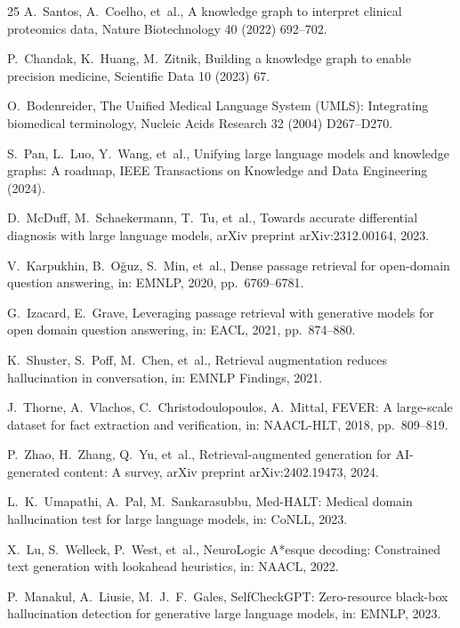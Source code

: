 \documentclass[review]{elsarticle}
\begin{document}
\begin{thebibliography}{25}
A.~Santos, A.~Coelho, et~al., A knowledge graph to interpret clinical proteomics data, Nature Biotechnology 40 (2022) 692--702.

P.~Chandak, K.~Huang, M.~Zitnik, Building a knowledge graph to enable precision medicine, Scientific Data 10 (2023) 67.

O.~Bodenreider, The Unified Medical Language System (UMLS): Integrating biomedical terminology, Nucleic Acids Research 32 (2004) D267--D270.

S.~Pan, L.~Luo, Y.~Wang, et~al., Unifying large language models and knowledge graphs: A roadmap, IEEE Transactions on Knowledge and Data Engineering (2024).

D.~McDuff, M.~Schaekermann, T.~Tu, et~al., Towards accurate differential diagnosis with large language models, arXiv preprint arXiv:2312.00164, 2023.

V.~Karpukhin, B.~O\u{g}uz, S.~Min, et~al., Dense passage retrieval for open-domain question answering, in: EMNLP, 2020, pp.~6769--6781.

G.~Izacard, E.~Grave, Leveraging passage retrieval with generative models for open domain question answering, in: EACL, 2021, pp.~874--880.

K.~Shuster, S.~Poff, M.~Chen, et~al., Retrieval augmentation reduces hallucination in conversation, in: EMNLP Findings, 2021.

J.~Thorne, A.~Vlachos, C.~Christodoulopoulos, A.~Mittal, FEVER: A large-scale dataset for fact extraction and verification, in: NAACL-HLT, 2018, pp.~809--819.

P.~Zhao, H.~Zhang, Q.~Yu, et~al., Retrieval-augmented generation for AI-generated content: A survey, arXiv preprint arXiv:2402.19473, 2024.

L.~K.~Umapathi, A.~Pal, M.~Sankarasubbu, Med-HALT: Medical domain hallucination test for large language models, in: CoNLL, 2023.

X.~Lu, S.~Welleck, P.~West, et~al., NeuroLogic A*esque decoding: Constrained text generation with lookahead heuristics, in: NAACL, 2022.

P.~Manakul, A.~Liusie, M.~J.~F.~Gales, SelfCheckGPT: Zero-resource black-box hallucination detection for generative large language models, in: EMNLP, 2023.


\end{thebibliography}
\end{document}
